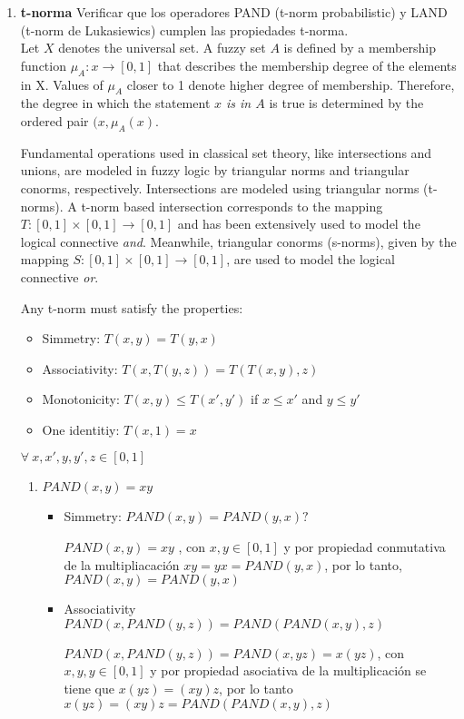 \documentclass[10pt, conference, compsocconf]{IEEEtranBST/IEEEtran}
\begin{document}
\begin{enumerate}
\item \textbf{t-norma}
Verificar que los operadores PAND (t-norm probabilistic) y LAND (t-norm de Lukasiewics) cumplen las propiedades t-norma.\\

Let $X$ denotes the universal set. A fuzzy set $A$ is defined by a membership function $\mu_{A}:x \rightarrow [0,1]$ that describes the membership degree of the elements in X. Values of $\mu_{A}$ closer to 1 denote higher degree of membership. Therefore, the degree in which the statement \emph{$x$ is in $A$} is true is determined by the ordered pair $(x,\mu_{A}(x)$.

Fundamental operations used in classical set theory, like intersections and unions, are modeled in fuzzy logic by triangular norms and triangular conorms, respectively. Intersections are modeled using triangular norms (t-norms). A t-norm based intersection corresponds to the mapping $T:[0,1] \times [0,1] \rightarrow [0,1]$ and has been extensively used to model the logical connective \emph{and}.
Meanwhile, triangular conorms (s-norms), given by the mapping $S:[0,1] \times [0,1] \rightarrow [0,1]$, are used to model the logical connective \emph{or}.

Any t-norm must satisfy the properties:
\begin{itemize}
\item Simmetry: $T(x,y)=T(y,x)$
\item Associativity: $T(x,T(y,z))=T(T(x,y),z)$
\item Monotonicity: $T(x,y) \leq T(x',y')$ if $x\leq x'$ and $y\leq y'$
\item One identitiy: $T(x,1)=x$
\end{itemize}
$\forall \ x,x',y,y',z \in [0,1]$

\begin{enumerate}
\item $PAND(x,y)=xy$
\begin{itemize}
\item Simmetry:
$PAND(x,y)=PAND(y,x)?$

$PAND(x,y)=xy$ , con $x,y \in [0,1]$ y por propiedad conmutativa de la multipliacación $xy=yx=PAND(y,x)$, por lo tanto, $PAND(x,y)=PAND(y,x)$

\item Associativity 
$PAND(x,PAND(y,z))=PAND(PAND(x,y),z)$

$PAND(x,PAND(y,z))=PAND(x,yz)=x(yz)$,  con $x,y,y \in [0,1]$ y por propiedad asociativa de la multiplicación se tiene que $x(yz) = (xy)z$, por lo tanto $x(yz)=(xy)z=PAND(PAND(x,y),z)$


\end{itemize}
\end{enumerate}
\end{enumerate}
\end{document}
